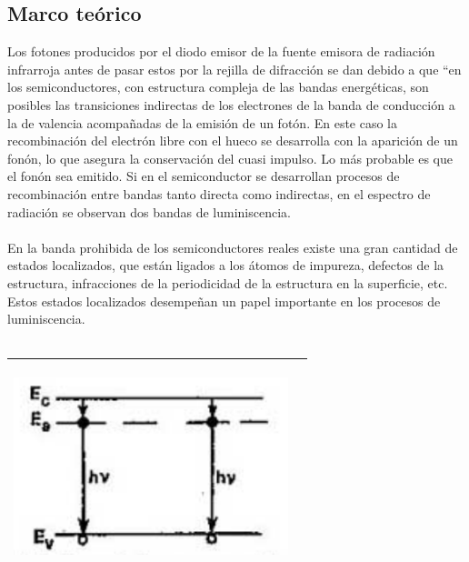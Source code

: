 \documentclass[12]{article}
\newenvironment{Figure}
{\par\medskip\noindent\minipage{\linewidth}}
{\endminipage\par\medskip}
\begin{document}
\begin{multicols}{2}
\section{Marco teórico}
Los fotones producidos por el diodo emisor de la fuente emisora de radiación infrarroja antes de pasar estos por la rejilla de difracción se dan debido a que “en los semiconductores, con estructura compleja de las bandas energéticas, son posibles las transiciones indirectas de los electrones de la banda de conducción  a la de valencia acompañadas de la emisión de un fotón. En este caso la recombinación del electrón libre con el hueco se desarrolla con la aparición de un fonón, lo que asegura la conservación del cuasi impulso. Lo más probable es que el fonón sea emitido. Si en el semiconductor se desarrollan procesos de recombinación entre bandas  tanto directa como indirectas, en el espectro de radiación se observan dos bandas de luminiscencia. \\ \\
En la banda prohibida de los semiconductores reales existe una gran cantidad de estados localizados, que están ligados a los átomos de impureza, defectos de la estructura, infracciones de la periodicidad de la estructura en la superficie, etc. Estos estados localizados desempeñan un papel importante  en los procesos de luminiscencia. \\ \\

\begin{Figure}	
\center
\begin{tabular}{|l|r|}
\hline
\includegraphics[width=8cm, height=6cm]{img/transiciones.png} \\ \hline
\end{tabular}
\label{fig:g1}
\end{Figure}


\end{multicols}
\end{document}
